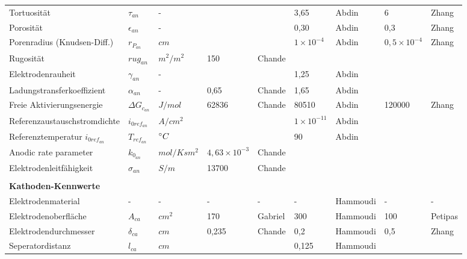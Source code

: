 \documentclass[onecolumn,10pt,titlepage]{article}
\begin{document}
\begin{table}[]
\begin{tabular*}{\textwidth}{lllllllll}
		Tortuosität 							& $\tau_{an}$			& - 				& 	 		& 	 		& 3,65 					& Abdin		& 6 					& Zhang 	\\
		Porosität 								& $\epsilon_{an}$		& - 				& 	 		& 	 		& 0,30 					& Abdin		& 0,3 					& Zhang 	\\
		Porenradius (Knudsen-Diff.) 			& $r_{P_{an}}$ 			& $cm$ 				& 	 		& 	 		& $1\times{10^{-4}}$	& Abdin		& $0,5\times{10^{-4}}$ 	& Zhang 	\\
		Rugosität 								& $rug_{an}$			& $m^{2}/m^{2}$		& 150 		& Chande	& 	 					& 			& 	 					& 	 		\\
		Elektrodenrauheit 						& $\gamma_{an}$ 		& -	 				& 	 		& 	 		& 1,25 					& Abdin		&  						& 	 		\\
		
		Ladungstransferkoeffizient 				& $\alpha_{an}$ 		& - 				& 0,65 		& Chande	& 1,65 					& Abdin		& 	 					& 	 		\\
		Freie Aktivierungsenergie 				& ${\Delta}G_{c_{an}}$	& $J/mol$ 			& 62836		& Chande	& 80510 				& Abdin		& 120000 				& Zhang 	\\
		Referenzaustauschstromdichte			& $i_{0ref_{an}}$		& $A/cm^{2}$ 		& 	 		& 	 		& $1\times{10^{-11}}$ 	& Abdin		& 	 					& 	 		\\
		Referenztemperatur $i_{0ref_{an}}$ 		& $T_{ref_{an}}$ 		& $\degree{C}$	 	& 	 		& 	 		& 90 					& Abdin		& 	 					& 	 		\\	
		Anodic rate parameter					& $k_{0_{an}}$			& $mol/Ksm^{2}$		& $4,63\times{10^{-3}}$ & Chande 				&& 	 		& 	 					& 	 		\\
		Elektrodenleitfähigkeit					& $\sigma_{an}$ 		& $S/m$				& 13700	 	& Chande 	& 						& 	 		& 	 					& 	 		\\
		
		&&&&&&&& \\
		\textbf{Kathoden-Kennwerte}&&&&&&&& \\
		Elektrodenmaterial 						& - 					& - 				& - 		& - 		& -		 				& Hammoudi 	& - 					& - 		\\
		Elektrodenoberfläche 					& $A_{ca}$ 				& $cm^{2}$ 			& 170 		& Gabriel	& 300 					& Hammoudi 	& 100 					& Petipas	\\
		Elektrodendurchmesser 					& $\delta_{ca}$ 		& $cm$ 				& 0,235		& Chande	& 0,2 					& Hammoudi 	& 0,5 					& Zhang 	\\
		Seperatordistanz 						& $l_{ca}$ 				& $cm$ 				& 	 		& 	 		& 0,125 				& Hammoudi 	& 	 					& 	 		\\
		

\end{tabular*}
\end{table}
\end{document}
